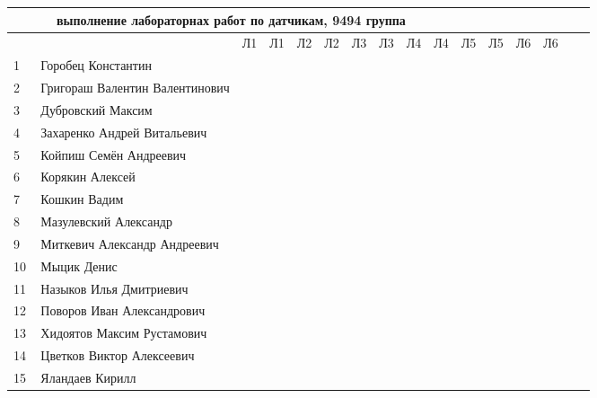 \newpage
%
\begin{tabular}{l|llccccccccccccc}
\multicolumn{10}{c}{выполнение лабораторнах работ по датчикам, 9494 группа} \\
\toprule
&&Л1&Л1& Л2&Л2& Л3&Л3& Л4&Л4 &Л5&Л5& Л6&Л6\\
\midrule
1\,& Горобец Константин               \\
2\,& Григораш Валентин Валентинович   \\
3\,& Дубровский Максим                \\
4\,& Захаренко Андрей Витальевич      \\
5\,& Койпиш Семён Андреевич           \\
\midrule
6\,& Корякин Алексей                  \\
7\,& Кошкин Вадим                     \\
8\,& Мазулевский Александр            \\
9\,& Миткевич Александр Андреевич     \\
10\,& Мыцик Денис                     \\
\midrule
11\,& Назыков Илья Дмитриевич         \\
12\,& Поворов Иван Александрович      \\
13\,& Хидоятов Максим Рустамович      \\
14\,& Цветков Виктор Алексеевич       \\
15\,& Яландаев Кирилл                 \\
\bottomrule
\end{tabular}



